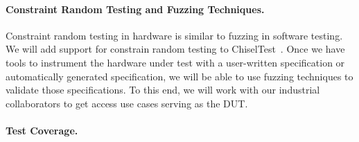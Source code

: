 \documentclass[fleqn,12pt]{article}
\newcommand{\todo}[1]{{\it TODO: #1}}
\begin{document}
%
%
%
%

\paragraph{Constraint Random Testing and Fuzzing Techniques.}

Constraint random testing in hardware is similar to fuzzing in software testing.
We will add support for constrain random testing to ChiselTest~\cite{chisel:tester2}.
Once we have tools to instrument the hardware under test with a user-written
specification or automatically generated specification, we will be able to use fuzzing techniques
to validate those specifications. To this end, we will work
with our industrial collaborators to get access use cases serving
as the DUT.

\paragraph{Test Coverage.}
\end{document}
